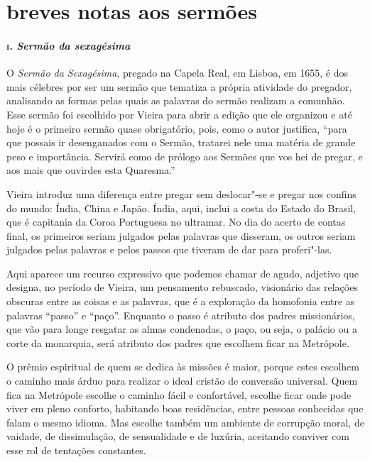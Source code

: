 \section*{breves notas aos sermões}

\paragraph{\textsc{i}. \emph{Sermão da sexagésima}}

O \emph{Sermão da Sexagésima}, pregado na Capela Real, em Lisboa, em
1655, é dos mais célebres por ser um sermão que tematiza a própria
atividade do pregador, analisando as formas pelas quais as palavras do
sermão realizam a comunhão. Esse sermão foi escolhido por Vieira para
abrir a edição que ele organizou e até hoje é o primeiro sermão quase
obrigatório, pois, como o autor justifica, ``para que possais ir
desenganados com o Sermão, tratarei nele uma matéria de grande peso e
importância. Servirá como de prólogo aos Sermões que vos hei de pregar,
e aos mais que ouvirdes esta Quaresma.''

Vieira introduz uma diferença entre pregar sem deslocar"-se e pregar nos
confins do mundo: Índia, China e Japão. Índia, aqui, inclui a costa do
Estado do Brasil, que é capitania da Coroa Portuguesa no ultramar. No
dia do acerto de contas final, os primeiros seriam julgados pelas
palavras que disseram, os outros seriam julgados pelas palavras e pelos
passos que tiveram de dar para proferi"-las.

Aqui aparece um recurso expressivo que podemos chamar de agudo, adjetivo
que designa, no período de Vieira, um pensamento rebuscado, visionário
das relações obscuras entre as coisas e as palavras, que é a exploração
da homofonia entre as palavras ``passo'' e ``paço''. Enquanto o passo é
atributo dos padres missionários, que vão para longe resgatar as almas
condenadas, o paço, ou seja, o palácio ou a corte da monarquia, será
atributo dos padres que escolhem ficar na Metrópole.

O prêmio espiritual de quem se dedica às missões é maior, porque estes
escolhem o caminho mais árduo para realizar o ideal cristão de conversão
universal. Quem fica na Metrópole escolhe o caminho fácil e confortável,
escolhe ficar onde pode viver em pleno conforto, habitando boas
residências, entre pessoas conhecidas que falam o mesmo idioma. Mas
escolhe também um ambiente de corrupção moral, de vaidade, de
dissimulação, de sensualidade e de luxúria, aceitando conviver com esse
rol de tentações constantes.

